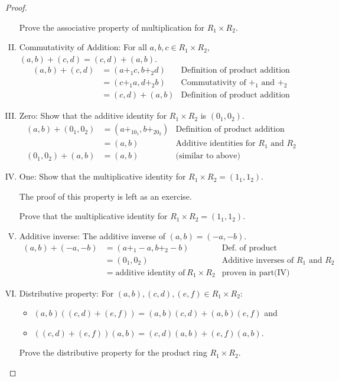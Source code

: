\begin{proof}
\begin{enumerate}[(I)]
\begin{exercise}{}
Prove the associative property of multiplication for $R_1 \times R_2$.
\end{exercise}
\item Commutativity of Addition:  For all $a,b,c\in R_1\times R_2$,\\ 
$(a,b)+(c,d)=(c,d)+(a,b).$
\begin{align*}
(a,b)+(c,d)&=(a+_1c,b+_2d) & \text{Definition of product addition}\\
&=(c+_1a,d+_2b) & \text{Commutativity of $+_1$ and $+_2$}\\
&=(c,d)+(a,b) & \text{Definition of product addition}
\end{align*}
\item Zero: Show that the additive identity for $R_1\times R_2$ is $(0_1,0_2)$.
\begin{align*}
(a,b)+(0_1,0_2)&=(a+_10_1,b+_20_2) & \text{Definition of product addition}\\
&=(a,b) & \text{Additive identities for $R_1$ and $R_2$}\\
(0_1,0_2)+(a,b)&=(a,b) & \text{(similar to above)}
\end{align*}
\item One: Show that the multiplicative identity for $R_1\times R_2=(1_1,1_2)$.

The proof of this property is left as an exercise.

\begin{exercise}{}
Prove that the multiplicative identity for $R_1\times R_2=(1_1,1_2)$.
\end{exercise}

\item Additive inverse:  The additive inverse of $(a,b)=(-a,-b)$.
\begin{align*}
(a,b)+(-a,-b)&=(a+_1-a,b+_2-b) & \text{Def.  of product addition}\\
&=(0_1,0_2) & \text{Additive inverses of $R_1$ and $R_2$}\\
&=\text{additive~identity~of}~R_1\times R_2 & \text{proven in part(IV)}
\end{align*}
\item Distributive property:  For $(a,b),(c,d),(e,f) \in  R_1 \times R_2$:
\begin{itemize}
\item $(a,b)((c,d)+(e,f)) = (a,b)(c,d)+(a,b)(e,f)$ and 
\item $((c,d)+(e,f))(a,b) = (c,d)(a,b)+(e,f)(a,b)$.
\end{itemize}
\begin{exercise}{}
Prove the distributive property for the product ring $R_1 \times R_2$.
\end{exercise}
\end{enumerate}
\end{proof}


